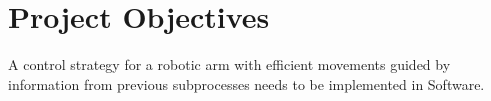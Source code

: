 
\chapter{Project Objectives}

A control strategy for a robotic arm with efficient movements guided by information from previous subprocesses needs to be implemented in Software.


